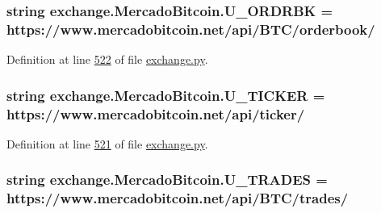 \subsubsection[{\texorpdfstring{U\+\_\+\+O\+R\+D\+R\+BK}{U_ORDRBK}}]{\setlength{\rightskip}{0pt plus 5cm}string exchange.\+Mercado\+Bitcoin.\+U\+\_\+\+O\+R\+D\+R\+BK = \textquotesingle{}https\+://www.\+mercadobitcoin.\+net/api/B\+TC/orderbook/\textquotesingle{}\hspace{0.3cm}{\ttfamily [static]}}\hypertarget{classexchange_1_1_mercado_bitcoin_a7dd22c2c0261557a694678d8057d2547}{}\label{classexchange_1_1_mercado_bitcoin_a7dd22c2c0261557a694678d8057d2547}


Definition at line \hyperlink{exchange_8py_source_l00522}{522} of file \hyperlink{exchange_8py_source}{exchange.\+py}.

\subsubsection[{\texorpdfstring{U\+\_\+\+T\+I\+C\+K\+ER}{U_TICKER}}]{\setlength{\rightskip}{0pt plus 5cm}string exchange.\+Mercado\+Bitcoin.\+U\+\_\+\+T\+I\+C\+K\+ER = \textquotesingle{}https\+://www.\+mercadobitcoin.\+net/api/{\bf ticker}/\textquotesingle{}\hspace{0.3cm}{\ttfamily [static]}}\hypertarget{classexchange_1_1_mercado_bitcoin_a310b7df5ae9e8a46bad918428c67d4e8}{}\label{classexchange_1_1_mercado_bitcoin_a310b7df5ae9e8a46bad918428c67d4e8}


Definition at line \hyperlink{exchange_8py_source_l00521}{521} of file \hyperlink{exchange_8py_source}{exchange.\+py}.

\subsubsection[{\texorpdfstring{U\+\_\+\+T\+R\+A\+D\+ES}{U_TRADES}}]{\setlength{\rightskip}{0pt plus 5cm}string exchange.\+Mercado\+Bitcoin.\+U\+\_\+\+T\+R\+A\+D\+ES = \textquotesingle{}https\+://www.\+mercadobitcoin.\+net/api/B\+TC/{\bf trades}/\textquotesingle{}\hspace{0.3cm}{\ttfamily [static]}}\hypertarget{classexchange_1_1_mercado_bitcoin_a20ad6407ef07ab8a55d3c022d1512a5d}{}\label{classexchange_1_1_mercado_bitcoin_a20ad6407ef07ab8a55d3c022d1512a5d}


